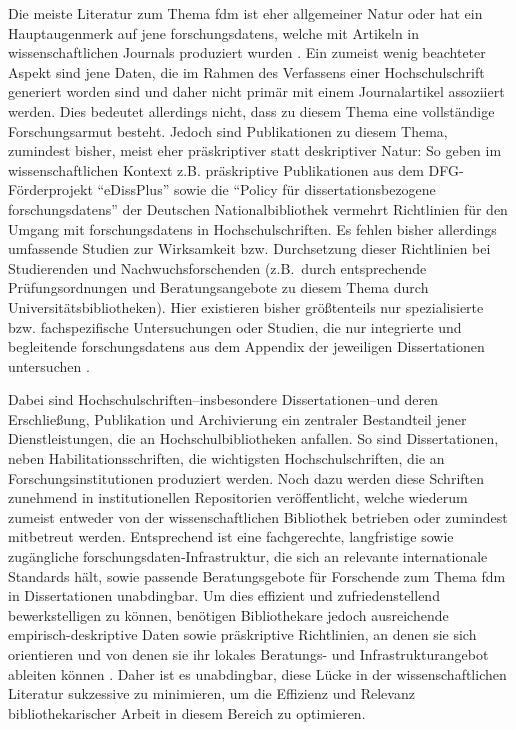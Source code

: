 Die meiste Literatur zum Thema \gls{fdm} ist eher allgemeiner Natur oder hat ein Hauptaugenmerk auf jene \glspl{forschungsdaten}, welche mit Artikeln in wissenschaftlichen Journals produziert wurden \autocite{Piwowar2013-DataReuse}. Ein zumeist wenig beachteter Aspekt sind jene Daten, die im Rahmen des Verfassens einer Hochschulschrift generiert worden sind und daher nicht primär mit einem Journalartikel assoziiert werden.
Dies bedeutet allerdings nicht, dass zu diesem Thema eine vollständige Forschungsarmut besteht.
Jedoch sind Publikationen zu diesem Thema, zumindest bisher, meist eher präskriptiver statt deskriptiver Natur:
So geben im wissenschaftlichen Kontext z.B. präskriptive Publikationen aus dem DFG-Förderprojekt \enquote{eDissPlus} \autocite{Weisbrod2017eDissPlus, KleinebergKaden2018, Weisbrod2018} sowie die \enquote{Policy für dissertationsbezogene \glspl{forschungsdaten}} der Deutschen Nationalbibliothek \autocite{dnb2017} vermehrt Richtlinien für den Umgang mit \glspl{forschungsdaten} in Hochschulschriften.
Es fehlen bisher allerdings umfassende Studien zur Wirksamkeit bzw.
Durchsetzung dieser Richtlinien bei Studierenden und Nachwuchsforschenden (z.B.~durch entsprechende Prüfungsordnungen und Beratungsangebote zu diesem Thema durch Universitätsbibliotheken).
Hier existieren bisher größtenteils nur spezialisierte bzw. fachspezifische Untersuchungen \autocite{Wünsche2018Forschungsdaten} oder Studien, die nur integrierte und begleitende \glspl{forschungsdaten} aus dem Appendix der jeweiligen Dissertationen untersuchen \autocite{Schöpfel2015}.

Dabei sind Hochschulschriften--insbesondere Dissertationen--und deren Erschließung, Publikation und Archivierung ein zentraler Bestandteil jener Dienstleistungen, die an Hochschulbibliotheken anfallen.
So sind Dissertationen, neben Habilitationsschriften, die wichtigsten Hochschulschriften, die an Forschungsinstitutionen produziert werden.
Noch dazu werden diese Schriften zunehmend in institutionellen Repositorien veröffentlicht, welche wiederum zumeist entweder von der wissenschaftlichen Bibliothek betrieben oder zumindest mitbetreut werden.
Entsprechend ist eine fachgerechte, langfristige sowie zugängliche \gls{forschungsdaten}-Infrastruktur, die sich an relevante internationale Standards hält, sowie passende Beratungsgebote für Forschende zum Thema \gls{fdm} in Dissertationen unabdingbar.
Um dies effizient und zufriedenstellend bewerkstelligen zu können, benötigen Bibliothekare jedoch ausreichende empirisch-deskriptive Daten sowie präskriptive Richtlinien, an denen sie sich orientieren und von denen sie ihr lokales Beratungs- und Infrastrukturangebot ableiten können \autocite{Martin2013Wissenschaftliche}.
Daher ist es unabdingbar, diese Lücke in der wissenschaftlichen Literatur sukzessive zu minimieren, um die Effizienz und Relevanz bibliothekarischer Arbeit in diesem Bereich zu optimieren.

